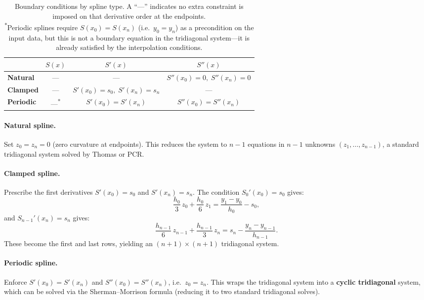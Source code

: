 \documentclass[11pt]{article}
\begin{document}
\begin{table}[h]
\centering
\renewcommand{\arraystretch}{1.8}
\begin{tabular}{l|c|c|c}
\toprule
 & $S(x)$ & $S'(x)$ & $S''(x)$ \\
\midrule
\textbf{Natural}
  & ---
  & ---
  & $S''(x_0) = 0,\; S''(x_n) = 0$ \\
\textbf{Clamped}
  & ---
  & $S'(x_0) = s_0,\; S'(x_n) = s_n$
  & --- \\
\textbf{Periodic}
  & ---\textsuperscript{*}
  & $S'(x_0) = S'(x_n)$
  & $S''(x_0) = S''(x_n)$ \\
\bottomrule
\end{tabular}
\caption{Boundary conditions by spline type. A ``---'' indicates no
extra constraint is imposed on that derivative order at the endpoints.\\
\textsuperscript{*}Periodic splines require $S(x_0) = S(x_n)$ (i.e.\ $y_0 = y_n$)
as a precondition on the input data, but this is not a boundary equation
in the tridiagonal system---it is already satisfied by the interpolation conditions.}
\label{tab:bc}
\end{table}

\paragraph{Natural spline.}
Set $z_0 = z_n = 0$ (zero curvature at endpoints). This reduces the system
to $n-1$ equations in $n-1$ unknowns $(z_1, \ldots, z_{n-1})$, a standard
tridiagonal system solved by Thomas or PCR.

\paragraph{Clamped spline.}
Prescribe the first derivatives $S'(x_0) = s_0$ and $S'(x_n) = s_n$.
The condition $S_0'(x_0) = s_0$ gives:
\[
\frac{h_0}{3}\,z_0 + \frac{h_0}{6}\,z_1
= \frac{y_1 - y_0}{h_0} - s_0,
\]
and $S_{n-1}'(x_n) = s_n$ gives:
\[
\frac{h_{n-1}}{6}\,z_{n-1} + \frac{h_{n-1}}{3}\,z_n
= s_n - \frac{y_n - y_{n-1}}{h_{n-1}}.
\]
These become the first and last rows, yielding an $(n+1)\times(n+1)$
tridiagonal system.

\paragraph{Periodic spline.}
Enforce $S'(x_0) = S'(x_n)$ and $S''(x_0) = S''(x_n)$, i.e.\ $z_0 = z_n$.
This wraps the tridiagonal system into a \textbf{cyclic tridiagonal} system,
which can be solved via the Sherman--Morrison formula (reducing it to two
standard tridiagonal solves).
\end{document}
